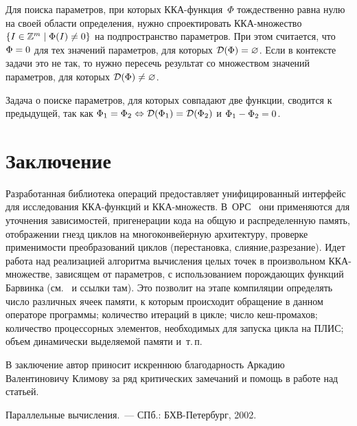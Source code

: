 \begin{multicols}{2}
Для поиска параметров, при которых ККА-функ\-ция~$\Phi$ тождественно
равна нулю на своей области определения, нужно спроектировать
ККА-мно\-жест\-во $\{ I\in\mathbb{Z}^m \mid \Phi(I) \hm\neq 0\}$ на
подпространство па\-ра\-мет\-ров. При этом считается, что $\Phi\hm=0$ для тех
значений па\-ра\-мет\-ров, для которых ${\cal D}(\Phi)\hm=\varnothing$. Если
в контексте задачи это не так, то нужно пересечь результат со
множеством значений па\-ра\-мет\-ров, для которых ${\cal D}(\Phi)\hm\neq\varnothing$.

Задача о поиске параметров, для которых совпадают две функции,
сводится к предыдущей, так как $\Phi_1\hm=\Phi_2\Leftrightarrow
{\cal D}(\Phi_1)\hm={\cal D}(\Phi_2)$ и $\Phi_1\hm-\Phi_2\hm=0$.


\section{Заключение}

Разработанная библиотека операций пред\-остав\-ля\-ет унифицированный
интерфейс для исследования ККА-функ\-ций и ККА-мно\-жеств. 
В~ОРС~\cite{OPS} они применяются для уточнения зависимостей, при\linebreak генерации
кода на общую и распределенную память, отображении гнезд циклов на
многоконвейерную архитектуру, проверке применимости преобразований
циклов (перестановка, слияние,\linebreak разрезание). Идет работа над
реализацией алгоритма вычисления целых точек в произвольном
ККА-мно\-жест\-ве, зависящем от параметров, с использованием порождающих
функций Барвинка (см.~\cite{Verdoolaege3} и ссылки там). Это
позволит на этапе компиляции определять чис\-ло различных ячеек
памяти, к которым происходит обращение в данном операторе программы;
количество итераций в цикле; чис\-ло кеш-про\-ма\-хов; количество
процессорных элементов, необходимых для запуска цикла на ПЛИС; объем
динамически выделяемой памяти и~т.\,п.

\bigskip

В заключение автор приносит искреннюю благодарность Аркадию Валентиновичу Климову за
ряд критических замечаний и помощь в работе над статьей.

{\small\frenchspacing
{%
\begin{thebibliography}{99}


  Параллельные вы\-чис\-ле\-ния.~--- СПб.: БХВ-Петербург, 2002.


\end{thebibliography}}}
\end{multicols}
